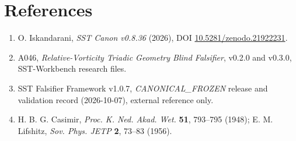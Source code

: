 \documentclass[10pt,a4paper]{article}
\begin{document}
\section*{References}
\begin{enumerate}
\item O. Iskandarani, \emph{SST Canon v0.8.36} (2026), DOI \href{https://doi.org/10.5281/zenodo.21922231}{10.5281/zenodo.21922231}.
\item A046, \emph{Relative-Vorticity Triadic Geometry Blind Falsifier}, v0.2.0 and v0.3.0, SST-Workbench research files.
\item SST Falsifier Framework v1.0.7, \emph{CANONICAL\_FROZEN} release and validation record (2026-10-07), external reference only.
\item H. B. G. Casimir, \emph{Proc. K. Ned. Akad. Wet.} \textbf{51}, 793--795 (1948); E. M. Lifshitz, \emph{Sov. Phys. JETP} \textbf{2}, 73--83 (1956).
\end{enumerate}
\end{document}
